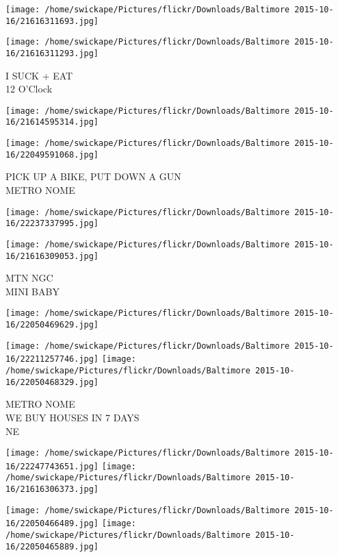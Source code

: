 \documentclass[10pt,letterpaper]{article}
\begin{document}
\texttt{[image: /home/swickape/Pictures/flickr/Downloads/Baltimore 2015-10-16/21616311693.jpg]}

\vspace{0.25in}
\texttt{[image: /home/swickape/Pictures/flickr/Downloads/Baltimore 2015-10-16/21616311293.jpg]}

I SUCK + EAT\\
12 O'Clock
\pagebreak

\texttt{[image: /home/swickape/Pictures/flickr/Downloads/Baltimore 2015-10-16/21614595314.jpg]}

\vspace{0.25in}
\texttt{[image: /home/swickape/Pictures/flickr/Downloads/Baltimore 2015-10-16/22049591068.jpg]}

PICK UP A BIKE, PUT DOWN A GUN\\
METRO NOME
\pagebreak

\texttt{[image: /home/swickape/Pictures/flickr/Downloads/Baltimore 2015-10-16/22237337995.jpg]}

\vspace{0.25in}
\texttt{[image: /home/swickape/Pictures/flickr/Downloads/Baltimore 2015-10-16/21616309053.jpg]}

MTN NGC\\
MINI BABY
\pagebreak

\texttt{[image: /home/swickape/Pictures/flickr/Downloads/Baltimore 2015-10-16/22050469629.jpg]}

\vspace{0.25in}
\texttt{[image: /home/swickape/Pictures/flickr/Downloads/Baltimore 2015-10-16/22211257746.jpg]}
\texttt{[image: /home/swickape/Pictures/flickr/Downloads/Baltimore 2015-10-16/22050468329.jpg]}

METRO NOME\\
WE BUY HOUSES IN 7 DAYS\\
NE
\pagebreak

\texttt{[image: /home/swickape/Pictures/flickr/Downloads/Baltimore 2015-10-16/22247743651.jpg]}
\texttt{[image: /home/swickape/Pictures/flickr/Downloads/Baltimore 2015-10-16/21616306373.jpg]}

\texttt{[image: /home/swickape/Pictures/flickr/Downloads/Baltimore 2015-10-16/22050466489.jpg]}
\texttt{[image: /home/swickape/Pictures/flickr/Downloads/Baltimore 2015-10-16/22050465889.jpg]}
\end{document}
